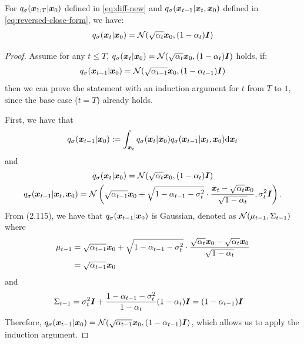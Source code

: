 \begin{lemma}
\label{lemma:reverse-process-consistency}
For $q_\sigma({\bm{x}}_{1:T} | {\bm{x}}_0)$ defined in \eqref{eq:diff-new} and $q_\sigma({\bm{x}}_{t-1} | {\bm{x}}_t, {\bm{x}}_0)$ defined in \eqref{eq:reversed-close-form}, we have:
\begin{align}
q_\sigma({\bm{x}}_{t} | {\bm{x}}_0) = {\mathcal{N}}(\sqrt{\alpha_t} {\bm{x}}_0, (1 - \alpha_t) {\bm{I}})
\end{align}
\end{lemma}
\begin{proof}
Assume for any $t \leq T$, $q_\sigma({\bm{x}}_{t} | {\bm{x}}_0) = {\mathcal{N}}(\sqrt{\alpha_t} {\bm{x}}_0, (1 - \alpha_t) {\bm{I}})$ holds, if:
\begin{align}
    q_\sigma({\bm{x}}_{t-1} | {\bm{x}}_0) = {\mathcal{N}}(\sqrt{\alpha_{t-1}} {\bm{x}}_0, (1 - \alpha_{t-1}) {\bm{I}})
\end{align}
then we can prove the statement with an induction argument for $t$ from $T$ to $1$, since the base case ($t = T$) already holds.

First, we have that
$$
    q_\sigma({\bm{x}}_{t-1} | {\bm{x}}_0) := \int_{{\bm{x}}_t} q_\sigma({\bm{x}}_{t} | {\bm{x}}_0) q_\sigma({\bm{x}}_{t-1} | {\bm{x}}_t, {\bm{x}}_0) \mathrm{d} {\bm{x}}_t
$$
and
\begin{gather}
   q_\sigma({\bm{x}}_{t} | {\bm{x}}_0) = {\mathcal{N}}(\sqrt{\alpha_t} {\bm{x}}_0, (1 - \alpha_t) {\bm{I}}) \\
   q_\sigma({\bm{x}}_{t-1} | {\bm{x}}_t, {\bm{x}}_0) = {\mathcal{N}}\left(\sqrt{\alpha_{t-1}} {\bm{x}}_{0} + \sqrt{1 - \alpha_{t-1} - \sigma^2_t} \cdot {\frac{{\bm{x}}_{t}  - \sqrt{\alpha_{t}} {\bm{x}}_0}{\sqrt{1 - \alpha_{t}}}}, \sigma_t^2 {\bm{I}} \right).
\end{gather}
From \citet{bishop2006pattern} (2.115), we have that $q_\sigma({\bm{x}}_{t-1} | {\bm{x}}_0)$ is Gaussian, denoted as ${\mathcal{N}}(\mu_{t-1}, \Sigma_{t-1})$ where
\begin{align}
    \mu_{t-1} & = \sqrt{\alpha_{t-1}} {\bm{x}}_{0} + \sqrt{1 - \alpha_{t-1} - \sigma^2_t} \cdot {\frac{\sqrt{\alpha_t} {\bm{x}}_0  - \sqrt{\alpha_{t}} {\bm{x}}_0}{\sqrt{1 - \alpha_{t}}}} \\
    & = \sqrt{\alpha_{t-1}} {\bm{x}}_{0}
\end{align}
and
\begin{align}
    \Sigma_{t-1} & = \sigma_t^2 {\bm{I}} + \frac{1 - \alpha_{t-1} - \sigma^2_t}{1 - \alpha_t} (1 - \alpha_t) {\bm{I}} = (1 - \alpha_{t-1}) {\bm{I}}
\end{align}
Therefore, $q_\sigma({\bm{x}}_{t-1} | {\bm{x}}_0) = {\mathcal{N}}(\sqrt{\alpha_{t-1}} {\bm{x}}_0, (1 - \alpha_{t-1}) {\bm{I}})$, which allows us to apply the induction argument.
\end{proof}


